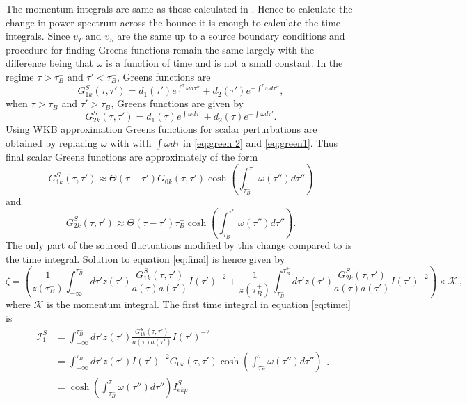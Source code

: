 \documentclass[12pt,a4paper]{article}
\numberwithin{equation}{section}
\numberwithin{equation}{section}
\begin{document}
The momentum integrals are same as those calculated in \cite{r1,r4}. Hence to calculate the change in power spectrum across the bounce it is enough to calculate the time integrals. Since $v_T$ and $v_S$ are the same up to a source boundary conditions and procedure for finding Greens functions remain the same largely with the difference being that $\omega$ is a function of time and is not a small constant.
In the regime $\tau>\tau_B^-$ and  $\tau'<\tau_B^-$, Greens functions are
\begin{equation}
    G^S_{1k}(\tau,\tau') = d_1(\tau') e^{\int^{\tau} \omega d\tau''} + d_2(\tau') e^{-\int^{\tau} \omega d\tau''},
\end{equation}
when $\tau>\tau_B^-$ and  $\tau'>\tau_B^-$, Greens functions are given by
\begin{equation}
    G^S_{2k}(\tau,\tau') = d_1(\tau) e^{\int \omega d\tau'} + d_2(\tau) e^{-\int \omega d\tau'}.
\end{equation}
Using WKB approximation Greens functions for scalar perturbations are obtained by replacing $\omega$ with 
with $\int \omega d\tau$ in \eqref{eq:green 2} and \eqref{eq:green1}.
Thus final scalar Greens functions are approximately  of the form 
\begin{equation}
     G_{1k}^S(\tau,\tau') \approx \Theta(\tau-\tau')  G_{0k}(\tau,\tau') \cosh(\int_{\tau_{B}^-}^{\tau} \omega(\tau'') d\tau'') 
     \label{eq:greenssc1}
\end{equation}
and
\begin{equation}
     G_{2k}^S(\tau,\tau') \approx \Theta(\tau-\tau')   \tau_B^-  \cosh(\int_{\tau_{B}^-}^{\tau'} \omega(\tau'') d\tau'').
     \label{eq:greenssc2}
\end{equation}
The only part of the sourced fluctuations modified by this change compared to \cite{Artymowski:2020pci} is the time integral. Solution to equation \eqref{eq:final} is hence given by
\begin{equation}
\zeta = \left( \frac{1}{z(\tau_B^-)} \int^{\tau_B^-}_{-\infty} d\tau' z(\tau') \frac{G_{1k}^S(\tau,\tau')}{a(\tau)a(\tau')} I(\tau')^{-2} + \frac{1}{z(\tau_B^+)} \int^{\tau_B^+}_{\tau_B^-} d\tau' z(\tau') \frac{G_{2k}^S(\tau,\tau')}{a(\tau)a(\tau')} I(\tau')^{-2} \right) \times \mathcal{K} \, ,
\label{eq:timei}
\end{equation}
where $\mathcal{K}$ is the momentum integral. 
The first time integral  in equation \eqref{eq:timei} is 
\begin{equation}
\begin{split}
    \mathcal{I}^S_1 &=  \int^{\tau_B^-}_{-\infty} d\tau' z(\tau') \frac{G_{1k}^S(\tau,\tau')}{a(\tau)a(\tau')} I(\tau')^{-2} \\
   & =\int^{\tau_B^-}_{-\infty} d\tau' z(\tau')  I(\tau')^{-2}  G_{0k}(\tau,\tau') \cosh(\int_{\tau_{B}^-}^{\tau} \omega(\tau'') d\tau'')\\
   &= \cosh(\int_{\tau_{B}^-}^{\tau} \omega(\tau'') d\tau'') I^S_{ekp}
    \end{split}.
    \label{eq:timei1}
\end{equation}
\end{document}
